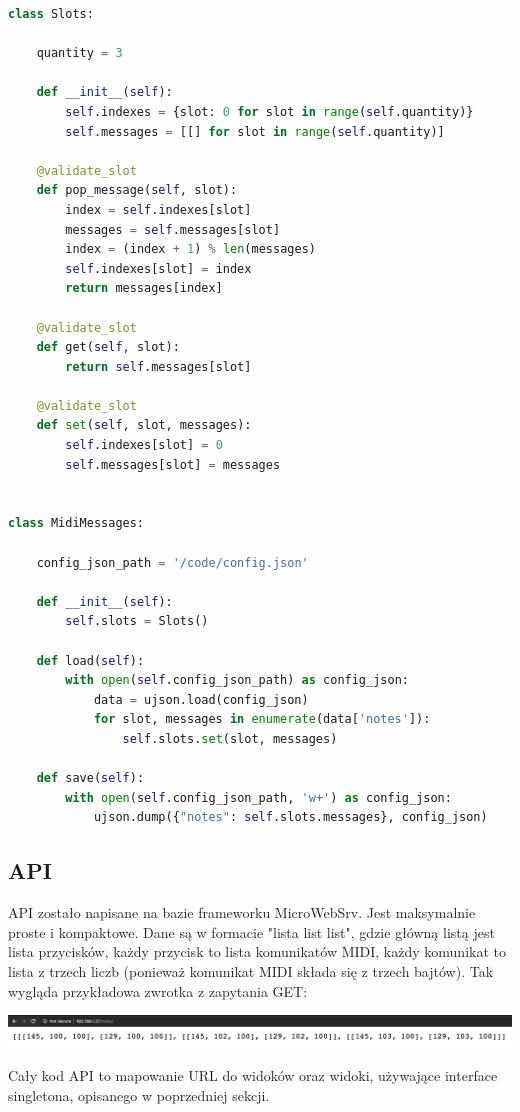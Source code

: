 \documentclass[eng,printmode]{mgr}
\begin{document}
\begin{lstlisting}[language=Python]
class Slots:

    quantity = 3

    def __init__(self):
        self.indexes = {slot: 0 for slot in range(self.quantity)}
        self.messages = [[] for slot in range(self.quantity)]

    @validate_slot
    def pop_message(self, slot):
        index = self.indexes[slot]
        messages = self.messages[slot]
        index = (index + 1) % len(messages)
        self.indexes[slot] = index
        return messages[index]

    @validate_slot
    def get(self, slot):
        return self.messages[slot]

    @validate_slot
    def set(self, slot, messages):
        self.indexes[slot] = 0
        self.messages[slot] = messages


class MidiMessages:

    config_json_path = '/code/config.json'

    def __init__(self):
        self.slots = Slots()

    def load(self):
        with open(self.config_json_path) as config_json:
            data = ujson.load(config_json)
            for slot, messages in enumerate(data['notes']):
                self.slots.set(slot, messages)

    def save(self):
        with open(self.config_json_path, 'w+') as config_json:
            ujson.dump({"notes": self.slots.messages}, config_json)

\end{lstlisting}
\subsection{API}

API zostało napisane na bazie frameworku MicroWebSrv. Jest maksymalnie proste i kompaktowe. Dane są w formacie "lista list list", gdzie główną listą jest lista przycisków, każdy przycisk to lista komunikatów MIDI, każdy komunikat to lista z trzech liczb (ponieważ komunikat MIDI składa się z trzech bajtów).
Tak wygląda przykładowa zwrotka z zapytania GET:

\bigbreak
\includegraphics[width=\textwidth]{api}

Cały kod API to mapowanie URL do widoków oraz widoki, używające interface singletona, opisanego w poprzedniej sekcji.
\end{document}
